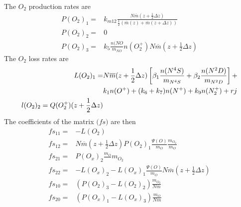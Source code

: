 %
The $O_2$ production rates are
%
\begin{align}
  P(O_2)_1 = & k_{m12}\frac{N\overline{m}(z+\frac{1}{2} \Delta z)}{\frac{1}{2}(\overline{m}(z) + \overline{m}(z+\Delta
   z))} \\
  P(O_2)_2 = & 0 \\
  P(O_2)_3 = & k_5 \frac{n(NO}{m_{NO}}n(O_2^+)N\overline{m}(z+\frac{1}{2} \Delta z)
\end{align}
%
The $O_2$ loss rates are
%
\begin{align}
  L(O_2)_1 = & N\overline{m}(z+\frac{1}{2} \Delta z)\left[ \beta_1 \frac{n(N^4S)}{m_{N^4S}} +
      \beta_2 \frac{n(N^2D)}{m_{N^2D}}\right] + \notag \\
      & k_1 n(O^+) + (k_6 + k_7)n(N^+) + k_9 n(N_2^+) + rj \\
  l(O_2)_2 = Q(O_2^+)(z+\frac{1}{2} \Delta z)
\end{align}
%
The coefficients of the matrix $\mathbf(fs)$ are then
%
\begin{align}
  fs_{11} = & - L(O_2) \\
  fs_{12} = & N\overline{m}(z+\frac{1}{2} \Delta z) P(O_2)_1
        \frac{\Psi(O)}{m_O}\frac{m_{O_2}}{m_O} \\
  fs_{21} = & P(O_x)_2 \frac{m_O}{}m_{O_2} \\
  fs_{22} = & -L(O_x)_2 - L(O_x)_1\frac{\Psi(O)}{m_O}N\overline{m}(z+\frac{1}{2} \Delta
         z)\\
  fs_{10} = & ( P(O_2)_3 - L(O_2)_2) \frac{m_{O_2}}{N\overline{m}} \\
  fs_{20} = & ( P(O_x)_1 - L(O_x)_3) \frac{m_{O}}{N\overline{m}} \\
\end{align}
%
%
